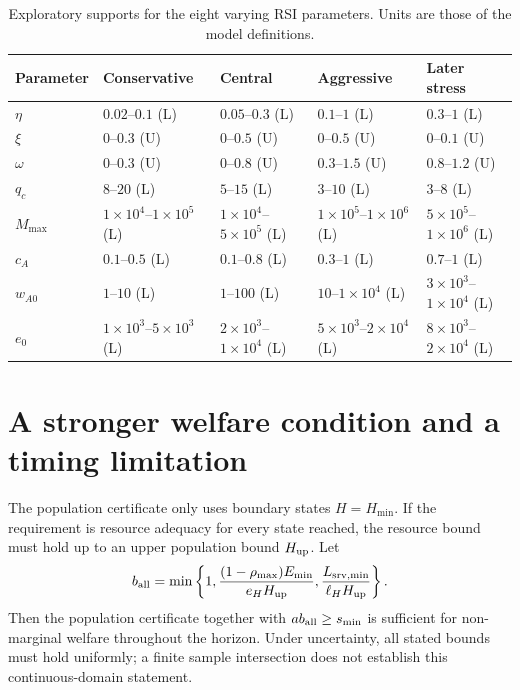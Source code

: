 \documentclass[12pt,a4paper]{article}
\theoremstyle{remark}
\newcommand{\Hmin}{H_{\min}}
\begin{document}
\begin{table}[htbp]\centering\footnotesize
\caption{Exploratory supports for the eight varying RSI parameters. Units are those of the model definitions.}\label{tab:ranges}
\begin{tabular}{@{}lllll@{}}\toprule
Parameter & Conservative & Central & Aggressive & Later stress\\\midrule
$\eta$ & $0.02$--$0.1$ (L) & $0.05$--$0.3$ (L) & $0.1$--$1$ (L) & $0.3$--$1$ (L)\\
$\xi$ & $0$--$0.3$ (U) & $0$--$0.5$ (U) & $0$--$0.5$ (U) & $0$--$0.1$ (U)\\
$\omega$ & $0$--$0.3$ (U) & $0$--$0.8$ (U) & $0.3$--$1.5$ (U) & $0.8$--$1.2$ (U)\\
$q_c$ & $8$--$20$ (L) & $5$--$15$ (L) & $3$--$10$ (L) & $3$--$8$ (L)\\
$M_{\max}$ & $1\!\times\!10^{4}$--$1\!\times\!10^{5}$ (L) & $1\!\times\!10^{4}$--$5\!\times\!10^{5}$ (L) & $1\!\times\!10^{5}$--$1\!\times\!10^{6}$ (L) & $5\!\times\!10^{5}$--$1\!\times\!10^{6}$ (L)\\
$c_A$ & $0.1$--$0.5$ (L) & $0.1$--$0.8$ (L) & $0.3$--$1$ (L) & $0.7$--$1$ (L)\\
$w_{A0}$ & $1$--$10$ (L) & $1$--$100$ (L) & $10$--$1\!\times\!10^{4}$ (L) & $3\!\times\!10^{3}$--$1\!\times\!10^{4}$ (L)\\
$e_0$ & $1\!\times\!10^{3}$--$5\!\times\!10^{3}$ (L) & $2\!\times\!10^{3}$--$1\!\times\!10^{4}$ (L) & $5\!\times\!10^{3}$--$2\!\times\!10^{4}$ (L) & $8\!\times\!10^{3}$--$2\!\times\!10^{4}$ (L)\\
\bottomrule\end{tabular}

\end{table}

\section{A stronger welfare condition and a timing limitation}
The population certificate only uses boundary states $H=\Hmin$. If the requirement is resource adequacy for every state reached, the resource bound must hold up to an upper population bound $H_{\rm up}$. Let
\[
b_{\rm all}=\min\left\{1,\frac{(1-\rho_{\max})E_{\min}}{e_HH_{\rm up}},
\frac{L_{{\rm srv},\min}}{\ell_HH_{\rm up}}\right\}.
\]
Then the population certificate together with $ab_{\rm all}\ge s_{\min}$ is sufficient for non-marginal welfare throughout the horizon. Under uncertainty, all stated bounds must hold uniformly; a finite sample intersection does not establish this continuous-domain statement.
\end{document}
